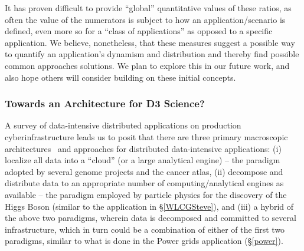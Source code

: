 







It has proven difficult to provide ``global'' quantitative values of
these ratios, as often the value of the numerators is
subject to how an application/scenario is defined, even more so for a
``class of applications'' as opposed to a specific application. We
believe, nonetheless, that these measures suggest a possible way to
quantify an application's dynamism and distribution and thereby find
possible common approaches solutions.  We plan to explore this in our
future work, and also hope others will consider building on these
initial concepts.


\subsubsection{Towards an Architecture for D3 Science?}


A survey of data-intensive distributed applications on production
cyberinfrastructure leads us to posit that there are three primary
macroscopic architectures~\cite{pilot_clouds} and approaches for distributed
data-intensive applications: (i) localize all data into a ``cloud''
(or a large analytical engine) -- the paradigm adopted by several
genome projects and the cancer atlas, (ii) decompose and distribute
data to an appropriate number of computing/analytical engines as
available -- the paradigm employed by particle physics for the
discovery of the Higgs Boson (similar to the application in
\S\ref{WLCGSteve}), and (iii) a hybrid of the above two paradigms,
wherein data is decomposed and committed to several infrastructure,
which in turn could be a combination of either of the first two
paradigms, similar to what is done in the Power grids application
(\S\ref{power}). 

